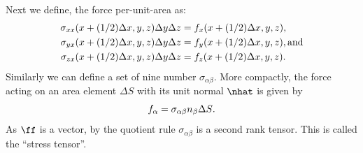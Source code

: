  Next we define, the force per-unit-area as:
\begin{subequations}
\begin{align} 
\sigma_{xx}(x+(1/2)\Delta x,y,z) \Delta y\Delta z&= f_x(x+(1/2)\Delta x,y,z)\/, \\
\sigma_{yx}(x+(1/2)\Delta x,y,z) \Delta y \Delta z&= f_y(x+(1/2)\Delta x,y,z)\/,
{\rm  and} \\ 
\sigma_{zx}(x+(1/2)\Delta x,y,z) \Delta y \Delta z  &= f_z(x+(1/2)\Delta x,y,z)\/. \end{align}
\end{subequations}
Similarly we can define a set of nine number $\sigma_{\alpha\beta}$.
More compactly, the force acting on an area element $\Delta S$ with
its unit normal $\nhat$ is given by 
\begin{equation}
f_{\alpha} = \sigma_{\alpha\beta}n_{\beta}\Delta S \/.
\end{equation}
As $\ff$ is a vector, by the quotient rule $\sigma_{\alpha\beta}$ is 
a second rank tensor.  This is called the ``stress tensor''.

